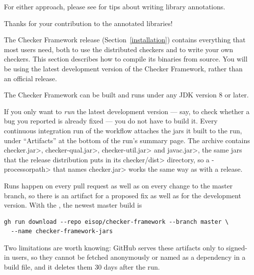 For either approach, please see  for
tips about writing library annotations.

Thanks for your contribution to the annotated libraries!



The Checker Framework release (Section~\ref{installation}) contains
everything that most users need, both to use the distributed checkers and
to write your own checkers.  This section describes how to compile its
binaries from source.  You will be using the latest development version of
the Checker Framework, rather than an official release.


The Checker Framework can be built and runs under any JDK version 8 or later.



If you only want to \emph{run} the latest development version --- say, to
check whether a bug you reported is already fixed --- you do not have to
build it.  Every continuous integration run of the
 workflow attaches the jars it built to the run, under ``Artifacts''
at the bottom of the run's summary page.  The archive contains
\<checker.jar>, \<checker-qual.jar>, \<checker-util.jar> and \<javac.jar>,
the same jars that the release distribution puts in its \<checker/dist>
directory, so a \<-processorpath> that names \<checker.jar> works the same
way as with a release.

Runs happen on every pull request as well as on every change to the master
branch, so there is an artifact for a proposed fix as well as for the
development version.  With the
, the newest master build is

\begin{Verbatim}
gh run download --repo eisop/checker-framework --branch master \
  --name checker-framework-jars
\end{Verbatim}

Two limitations are worth knowing:  GitHub serves these artifacts only to
signed-in users, so they cannot be fetched anonymously or named as a
dependency in a build file, and it deletes them 30 days after the run.


